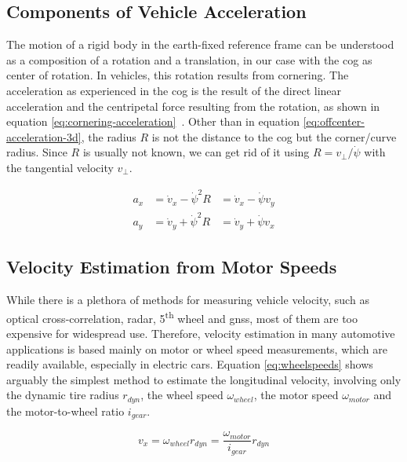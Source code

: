 \subsection{Components of Vehicle Acceleration}
The motion of a rigid body in the earth-fixed reference frame can be understood as a composition of a rotation and a translation, in our case with the \gls{cog} as center of rotation. In vehicles, this rotation results from cornering.  The acceleration as experienced in the \gls{cog} is the result of the direct linear acceleration and the centripetal force resulting from the rotation, as shown in equation \ref{eq:cornering-acceleration}~\cite[p.~146]{Milliken.1996}. Other than in equation \ref{eq:offcenter-acceleration-3d}, the radius $R$ is not the distance to the \gls{cog} but the corner/curve radius. Since $R$ is usually not known, we can get rid of it using $R = v_{\perp} / \dot{\psi}$ with the tangential velocity $v_{\perp}$.

\begin{subequations}\label{eq:cornering-acceleration}
\begin{alignat}{3}%
a_x &= \dot{v}_x - \dot{\psi}^2 R &= \dot{v}_x - \dot{\psi}v_y \\%
a_y &= \dot{v}_y + \dot{\psi}^2 R &= \dot{v}_y + \dot{\psi}v_x%
\end{alignat}
\end{subequations}


\subsection{Velocity Estimation from Motor Speeds}
While there is a plethora of methods for measuring vehicle velocity, such as optical cross-correlation, radar, 5\textsuperscript{th} wheel and \gls{gnss}, most of them are too expensive for widespread use. Therefore, velocity estimation in many automotive applications is based mainly on motor or wheel speed measurements, which are readily available, especially in electric cars. Equation \ref{eq:wheelspeeds} shows arguably the simplest method to estimate the longitudinal velocity, involving only the dynamic tire radius $r_{dyn}$, the wheel speed $\omega_{wheel}$, the motor speed $\omega_{motor}$ and the motor-to-wheel ratio $i_{gear}$.

\begin{equation}\label{eq:wheelspeeds}%
v_x = \omega_{wheel} r_{dyn} = \frac{\omega_{motor}}{i_{gear}} r_{dyn}%
\end{equation}

